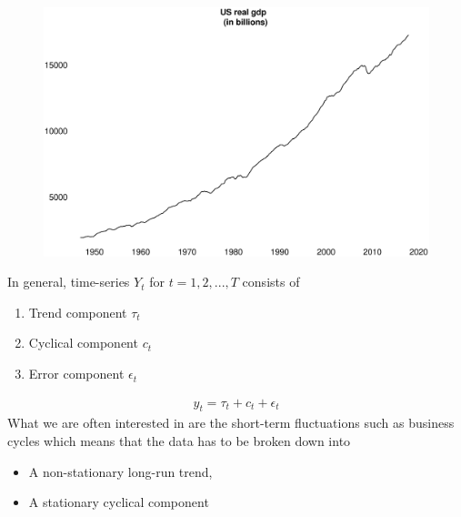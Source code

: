 \documentclass{beamer}
\begin{document}
\begin{frame}
  \begin{figure}
    \includegraphics[scale=.25]{us_gdp.eps}
  \end{figure}
\end{frame}

\begin{frame}
  In general, time-series $Y_t$ for $t=1,2,...,T$ consists of  
 \begin{enumerate}
   \item Trend component $\tau_t$
   \item Cyclical component $c_t$
   \item Error component $\epsilon_t$
 \end{enumerate}
 \begin{align}
   y_t=\tau_t + c_t + \epsilon_t
 \end{align}
 \medskip
 What we are often interested in are the short-term fluctuations such as business cycles which means that the data has to be broken down into
  \begin{itemize}
    \item A non-stationary long-run trend, 
    \item A stationary cyclical component
  \end{itemize}  
\end{frame}
\end{document}
